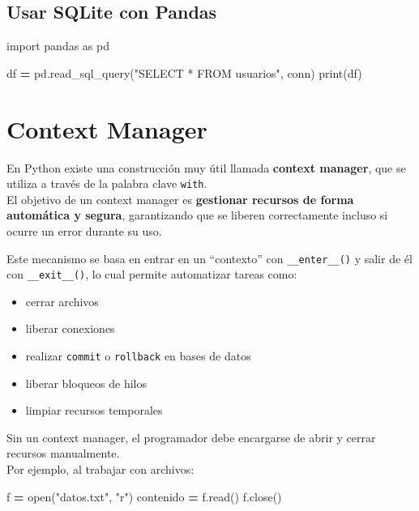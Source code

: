 \documentclass[
]{book}
\newenvironment{Shaded}{\begin{snugshade}}{\end{snugshade}}
\newcommand{\BuiltInTok}[1]{#1}
\newcommand{\ImportTok}[1]{#1}
\newcommand{\NormalTok}[1]{#1}
\newcommand{\OperatorTok}[1]{\textcolor[rgb]{0.81,0.36,0.00}{\textbf{#1}}}
\newcommand{\StringTok}[1]{\textcolor[rgb]{0.31,0.60,0.02}{#1}}
\providecommand{\tightlist}{%
  \setlength{\itemsep}{0pt}\setlength{\parskip}{0pt}}
\theoremstyle{break}
\theoremstyle{nonumberplain}
\begin{document}
\subsection{Usar SQLite con Pandas}\label{usar-sqlite-con-pandas}

\begin{Shaded}
\begin{Highlighting}[]
\ImportTok{import}\NormalTok{ pandas }\ImportTok{as}\NormalTok{ pd}

\NormalTok{df }\OperatorTok{=}\NormalTok{ pd.read\_sql\_query(}\StringTok{"SELECT * FROM usuarios"}\NormalTok{, conn)}
\BuiltInTok{print}\NormalTok{(df)}
\end{Highlighting}
\end{Shaded}

\section{Context Manager}\label{context-manager}

En Python existe una construcción muy útil llamada \textbf{context manager}, que se utiliza a través de la palabra clave \texttt{with}.\\
El objetivo de un context manager es \textbf{gestionar recursos de forma automática y segura}, garantizando que se liberen correctamente incluso si ocurre un error durante su uso.

Este mecanismo se basa en entrar en un ``contexto'' con \texttt{\_\_enter\_\_()} y salir de él con \texttt{\_\_exit\_\_()}, lo cual permite automatizar tareas como:

\begin{itemize}
\tightlist
\item
  cerrar archivos
\item
  liberar conexiones
\item
  realizar \texttt{commit} o \texttt{rollback} en bases de datos
\item
  liberar bloqueos de hilos
\item
  limpiar recursos temporales
\end{itemize}

Sin un context manager, el programador debe encargarse de abrir y cerrar recursos manualmente.\\
Por ejemplo, al trabajar con archivos:

\begin{Shaded}
\begin{Highlighting}[]
\NormalTok{f }\OperatorTok{=} \BuiltInTok{open}\NormalTok{(}\StringTok{"datos.txt"}\NormalTok{, }\StringTok{"r"}\NormalTok{)}
\NormalTok{contenido }\OperatorTok{=}\NormalTok{ f.read()}
\NormalTok{f.close()}
\end{Highlighting}
\end{Shaded}
\end{document}
